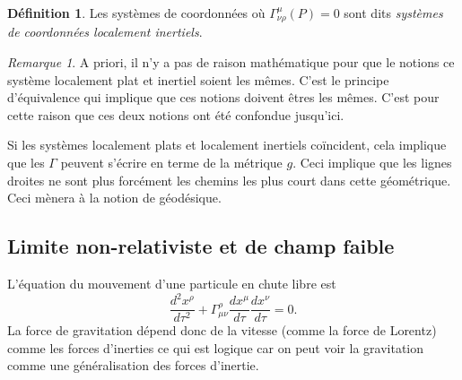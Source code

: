 \documentclass[a4paper,11pt]{report}
\theoremstyle{definition}
\theoremstyle{plain}
\theoremstyle{definition}
\newtheorem{defn}{Définition}[chapter]
\theoremstyle{remark}
\newtheorem{rmk}{Remarque}[chapter]
\begin{document}
            \begin{defn}
                Les systèmes de coordonnées où $\Gamma^\mu_{\nu\rho}(P) = 0$ sont dits \textit{systèmes de coordonnées localement inertiels}.
            \end{defn}
            
            \begin{rmk}
                A priori, il n'y a pas de raison mathématique pour que le notions ce système localement plat et inertiel soient les mêmes. C'est le principe d'équivalence qui implique que ces notions doivent êtres les mêmes. C'est pour cette raison que ces deux notions ont été confondue jusqu'ici.
            \end{rmk}
            
            Si les systèmes localement plats et localement inertiels coïncident, cela implique que les $\Gamma$ peuvent s'écrire en terme de la métrique $g$. Ceci implique que les lignes droites ne sont plus forcément les chemins les plus court dans cette géométrique. Ceci mènera à la notion de géodésique.
            
        \subsection{Limite non-relativiste et de champ faible}
            
            L'équation du mouvement d'une particule en chute libre est 
            \begin{equation}
                \frac{d^2x^\rho}{d\tau^2}+\Gamma^\rho_{\mu\nu}\frac{dx^\mu}{d\tau}\frac{dx^\nu}{d\tau} = 0.
            \end{equation}
            La force de gravitation dépend donc de la vitesse (comme la force de Lorentz) comme les forces d'inerties ce qui est logique car on peut voir la gravitation comme une généralisation des forces d'inertie.\\
            
\end{document}
